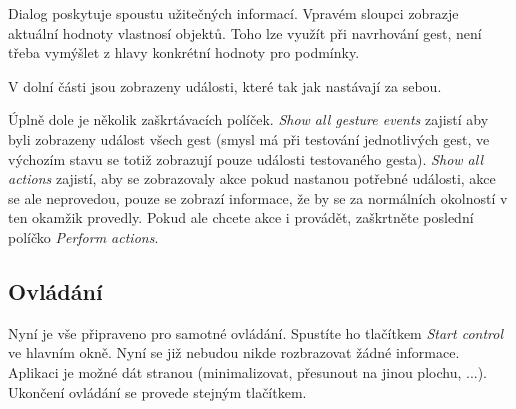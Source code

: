 Dialog poskytuje spoustu užitečných informací. Vpravém sloupci zobrazje
aktuální hodnoty vlastnosí objektů. Toho lze využít při navrhování gest, není
třeba vymýšlet z hlavy konkrétní hodnoty pro podmínky.

V dolní části jsou zobrazeny události, které tak jak nastávají za sebou.

Úplně dole je několik zaškrtávacích políček. \emph{Show all gesture events}
zajistí aby byli zobrazeny událost všech gest (smysl má při testování
jednotlivých gest, ve výchozím stavu se totiž zobrazují pouze události
testovaného gesta). \emph{Show all actions} zajistí, aby se zobrazovaly akce
pokud nastanou potřebné události, akce se ale neprovedou, pouze se zobrazí
informace, že by se za normálních okolností v ten okamžik provedly. Pokud ale
chcete akce i provádět, zaškrtněte poslední políčko \emph{Perform actions}.

\subsection{Ovládání}
Nyní je vše připraveno pro samotné ovládání. Spustíte ho tlačítkem \emph{Start
control} ve hlavním okně. Nyní se již nebudou nikde rozbrazovat žádné
informace. Aplikaci je možné dát stranou (minimalizovat, přesunout na jinou
plochu, ...). Ukončení ovládání se provede stejným tlačítkem.
